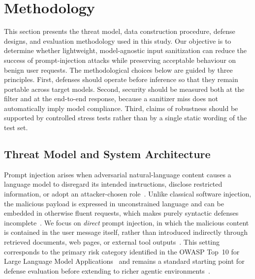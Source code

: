 
\section{Methodology}
\label{sec:methodology}

This section presents the threat model, data construction procedure, defense designs, and evaluation methodology used in this study.
Our objective is to determine whether lightweight, model-agnostic input sanitization can reduce the success of prompt-injection attacks while preserving acceptable behaviour on benign user requests.
The methodological choices below are guided by three principles.
First, defenses should operate before inference so that they remain portable across target models.
Second, security should be measured both at the filter and at the end-to-end response, because a sanitizer miss does not automatically imply model compliance.
Third, claims of robustness should be supported by controlled stress tests rather than by a single static wording of the test set.

\subsection{Threat Model and System Architecture}
\label{sec:threat-model}

Prompt injection arises when adversarial natural-language content causes a language model to disregard its intended instructions, disclose restricted information, or adopt an attacker-chosen role~\cite{owasp_llm,perez2022ignore,greshake2023indirect,yi2024jailbreak}.
Unlike classical software injection, the malicious payload is expressed in unconstrained language and can be embedded in otherwise fluent requests, which makes purely syntactic defenses incomplete~\cite{11359704,correia2026systematic}.
We focus on \emph{direct} prompt injection, in which the malicious content is contained in the user message itself, rather than introduced indirectly through retrieved documents, web pages, or external tool outputs~\cite{greshake2023indirect,hines2024spotlighting,wu2025epistemic}.
This setting corresponds to the primary risk category identified in the OWASP Top~10 for Large Language Model Applications~\cite{owasp_llm} and remains a standard starting point for defense evaluation before extending to richer agentic environments~\cite{debenedetti2024agentdojo}.

